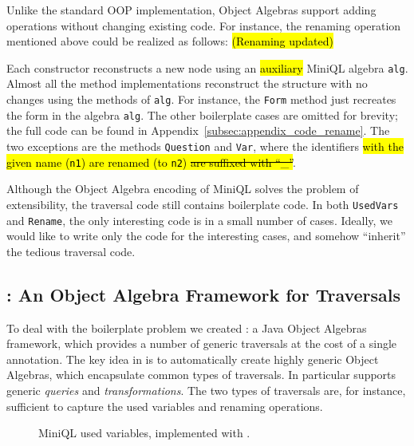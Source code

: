 Unlike the standard OOP implementation,
Object Algebras support adding operations without changing existing code.
For instance, the renaming operation mentioned above could be realized
as follows: \hl{(Renaming updated)}


Each
constructor reconstructs a new node using an \hl{auxiliary} MiniQL algebra \lstinline{alg}.
Almost all the method implementations reconstruct the structure with
no changes using the methods of \lstinline{alg}. For instance, the \lstinline{Form} method just recreates the form in the algebra \lstinline{alg}. The other boilerplate cases are omitted for brevity; the full code can be found in
  Appendix~\ref{subsec:appendix_code_rename}. The two exceptions are the
methods \lstinline{Question} and \lstinline{Var}, where the identifiers \hl{with the given name (\lstinline{n1}) are renamed (to \lstinline{n2}) \sout{are suffixed with ``\_''}}.

Although the Object Algebra encoding of MiniQL solves the problem of extensibility, the traversal code still contains boilerplate code.
In both \lstinline{UsedVars} and \lstinline{Rename}, the only interesting code
is in a small number of cases.  Ideally, we would like to write only
the code for the interesting cases, and somehow ``inherit'' the
tedious traversal code.

\subsection{\Name: An Object Algebra Framework for Traversals}

To deal with the boilerplate problem we created \Name: a Java Object
Algebras framework, which provides a number of generic traversals at
the cost of a single annotation. The key idea in \name is to
automatically create highly generic Object Algebras, which encapsulate
common types of traversals. In particular \name supports generic
\emph{queries} and \emph{transformations}. The two types of
traversals are, for instance,  sufficient to capture the used variables and
renaming operations.

\begin{figure}[t]
\nocaptionrule
\caption{MiniQL used variables, implemented with \Name.}
\label{usedvars_with_oaframework}
\end{figure}

